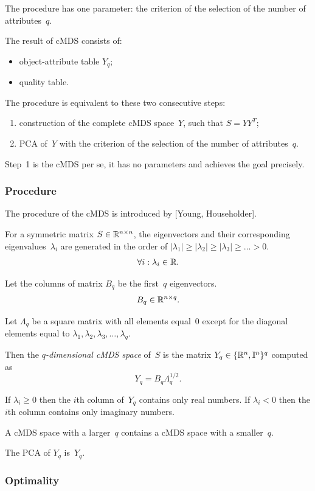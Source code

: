 \documentclass[10pt,a4paper]{article}
\begin{document}
The procedure has one parameter: the criterion of the selection of the number of attributes~$q$.

The result of cMDS consists of:
\begin{itemize}
    \item object-attribute table $Y_q$;
    \item quality table.
\end{itemize}

The procedure is equivalent to these two consecutive steps:
\begin{enumerate}
    \item construction of the complete cMDS space~$Y$, such that $S = YY^T$;
    \item PCA of~$Y$ with the criterion of the selection of the number of attributes~$q$.
\end{enumerate}

Step~1 is the cMDS per se, it has no parameters and achieves the goal precisely. 


\subsubsection {Procedure}

The procedure of the cMDS is introduced by [Young, Householder].

For a symmetric matrix $S \in \mathbb R^{n \times n}$, 
the eigenvectors and their corresponding eigenvalues~$\lambda_i$
are generated in the order of $|\lambda_1| \ge |\lambda_2| \ge |\lambda_3| \ge \dots > 0$.
$$ \forall i: \lambda_i \in \mathbb R.$$

Let the columns of matrix $B_q$ be the first~$q$ eigenvectors.
$$ B_q \in \mathbb R^{n \times q}.$$

Let $\Lambda_q$ be a square matrix with all elements equal~0
except for the diagonal elements equal to $\lambda_1, \lambda_2, \lambda_3, \dots, \lambda_q$.

Then the {\em $q$-dimensional cMDS space} of~$S$ is the matrix $Y_q \in \{\mathbb R^n,\mathbb I^n\}^q$ computed as
$$ Y_q = B_q \Lambda_q^{1/2}. $$

If $\lambda_i \ge 0$ then the $i$th column of~$Y_q$ contains only real numbers. 
If $\lambda_i < 0$ then the $i$th column contains only imaginary numbers. 

A cMDS space with a larger~$q$ contains a cMDS space with a smaller~$q$.

The PCA of $Y_q$ is~$Y_q$.


\subsubsection{Optimality}
\end{document}
